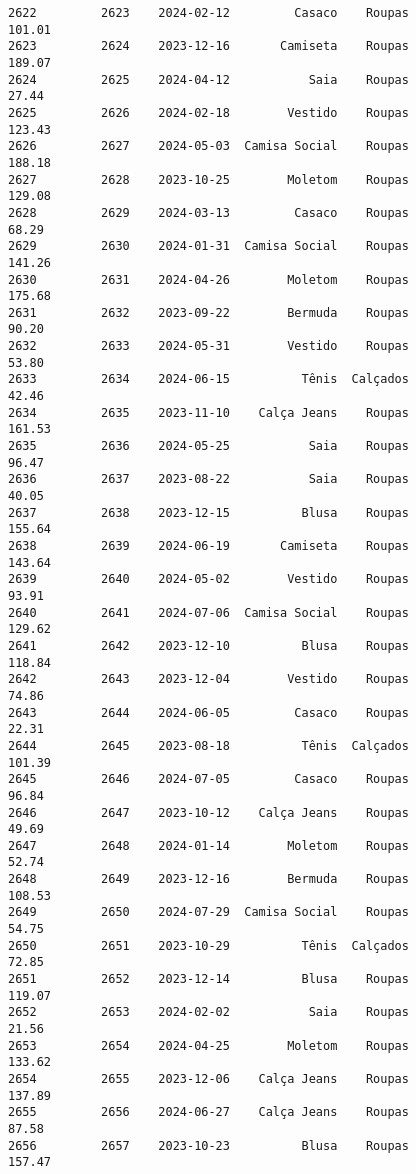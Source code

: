 \documentclass[11pt]{article}
\begin{document}
\begin{Verbatim}[commandchars=\\\{\}]
2622         2623    2024-02-12         Casaco    Roupas          101.01   
2623         2624    2023-12-16       Camiseta    Roupas          189.07   
2624         2625    2024-04-12           Saia    Roupas           27.44   
2625         2626    2024-02-18        Vestido    Roupas          123.43   
2626         2627    2024-05-03  Camisa Social    Roupas          188.18   
2627         2628    2023-10-25        Moletom    Roupas          129.08   
2628         2629    2024-03-13         Casaco    Roupas           68.29   
2629         2630    2024-01-31  Camisa Social    Roupas          141.26   
2630         2631    2024-04-26        Moletom    Roupas          175.68   
2631         2632    2023-09-22        Bermuda    Roupas           90.20   
2632         2633    2024-05-31        Vestido    Roupas           53.80   
2633         2634    2024-06-15          Tênis  Calçados           42.46   
2634         2635    2023-11-10    Calça Jeans    Roupas          161.53   
2635         2636    2024-05-25           Saia    Roupas           96.47   
2636         2637    2023-08-22           Saia    Roupas           40.05   
2637         2638    2023-12-15          Blusa    Roupas          155.64   
2638         2639    2024-06-19       Camiseta    Roupas          143.64   
2639         2640    2024-05-02        Vestido    Roupas           93.91   
2640         2641    2024-07-06  Camisa Social    Roupas          129.62   
2641         2642    2023-12-10          Blusa    Roupas          118.84   
2642         2643    2023-12-04        Vestido    Roupas           74.86   
2643         2644    2024-06-05         Casaco    Roupas           22.31   
2644         2645    2023-08-18          Tênis  Calçados          101.39   
2645         2646    2024-07-05         Casaco    Roupas           96.84   
2646         2647    2023-10-12    Calça Jeans    Roupas           49.69   
2647         2648    2024-01-14        Moletom    Roupas           52.74   
2648         2649    2023-12-16        Bermuda    Roupas          108.53   
2649         2650    2024-07-29  Camisa Social    Roupas           54.75   
2650         2651    2023-10-29          Tênis  Calçados           72.85   
2651         2652    2023-12-14          Blusa    Roupas          119.07   
2652         2653    2024-02-02           Saia    Roupas           21.56   
2653         2654    2024-04-25        Moletom    Roupas          133.62   
2654         2655    2023-12-06    Calça Jeans    Roupas          137.89   
2655         2656    2024-06-27    Calça Jeans    Roupas           87.58   
2656         2657    2023-10-23          Blusa    Roupas          157.47   

\end{Verbatim}
\end{document}
